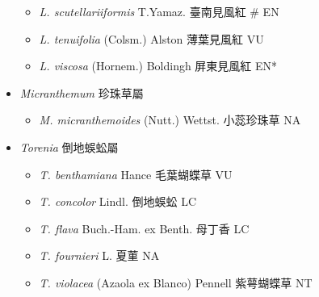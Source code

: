\begin{itemize}
\begin{itemize}
        \item[] \textit{L. scutellariiformis} T.Yamaz.  臺南見風紅  \# EN
        \item[] \textit{L. tenuifolia} (Colsm.) Alston  薄葉見風紅   VU
        \item[] \textit{L. viscosa} (Hornem.) Boldingh  屏東見風紅   EN*
  \end{itemize}
 \item[] \textit{Micranthemum} 珍珠草屬
                                
  \begin{itemize}
        \item[] \textit{M. micranthemoides} (Nutt.) Wettst.  小蕊珍珠草   NA
  \end{itemize}
 \item[] \textit{Torenia} 倒地蜈蚣屬
                                
  \begin{itemize}
        \item[] \textit{T. benthamiana} Hance  毛葉蝴蝶草   VU
        \item[] \textit{T. concolor} Lindl.  倒地蜈蚣   LC
        \item[] \textit{T. flava} Buch.-Ham. ex Benth.  母丁香   LC
        \item[] \textit{T. fournieri} L.  夏菫   NA
        \item[] \textit{T. violacea} (Azaola ex Blanco) Pennell  紫萼蝴蝶草   NT
  \end{itemize}
  \end{itemize}
